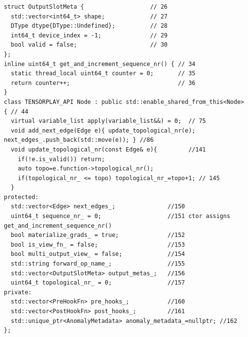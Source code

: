 \begin{lstlisting}[caption={output metadata and base.}, label=lst:nodefields]
struct OutputSlotMeta {                   // 26
  std::vector<int64_t> shape;             // 27
  DType dtype{DType::Undefined};          // 28
  int64_t device_index = -1;              // 29
  bool valid = false;                     // 30
};
inline uint64_t get_and_increment_sequence_nr() { // 34
  static thread_local uint64_t counter = 0;       // 35
  return counter++;                               // 36
}
class TENSORPLAY_API Node : public std::enable_shared_from_this<Node> { // 44
  virtual variable_list apply(variable_list&&) = 0;  // 75
  void add_next_edge(Edge e){ update_topological_nr(e); next_edges_.push_back(std::move(e)); } //86
  void update_topological_nr(const Edge& e){         //141
    if(!e.is_valid()) return;
    auto topo=e.function->topological_nr();
    if(topological_nr_ <= topo) topological_nr_=topo+1; // 145
  }
protected:
  std::vector<Edge> next_edges_;               //150
  uint64_t sequence_nr_ = 0;                   //151 ctor assigns get_and_increment_sequence_nr()
  bool materialize_grads_ = true;              //152
  bool is_view_fn_ = false;                    //153
  bool multi_output_view_ = false;             //154
  std::string forward_op_name_;                //155
  std::vector<OutputSlotMeta> output_metas_;   //156
  uint64_t topological_nr_ = 0;                //157
private:
  std::vector<PreHookFn> pre_hooks_;           //160
  std::vector<PostHookFn> post_hooks_;         //161
  std::unique_ptr<AnomalyMetadata> anomaly_metadata_=nullptr; //162
};
\end{lstlisting}

